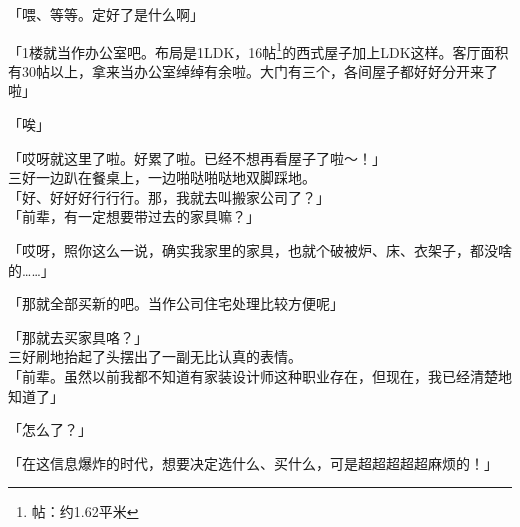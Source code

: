 「喂、等等。定好了是什么啊」

「1楼就当作办公室吧。布局是1LDK，16帖\footnote{帖：约1.62平米}的西式屋子加上LDK这样。客厅面积有30帖以上，拿来当办公室绰绰有余啦。大门有三个，各间屋子都好好分开来了啦」

「唉」

「哎呀就这里了啦。好累了啦。已经不想再看屋子了啦～！」\\

三好一边趴在餐桌上，一边啪哒啪哒地双脚踩地。\\

「好、好好好行行行。那，我就去叫搬家公司了？」\\

「前辈，有一定想要带过去的家具嘛？」

「哎呀，照你这么一说，确实我家里的家具，也就个破被炉、床、衣架子，都没啥的……」

「那就全部买新的吧。当作公司住宅处理比较方便呢」

「那就去买家具咯？」\\

三好刷地抬起了头摆出了一副无比认真的表情。\\

「前辈。虽然以前我都不知道有家装设计师这种职业存在，但现在，我已经清楚地知道了」

「怎么了？」

「在这信息爆炸的时代，想要决定选什么、买什么，可是超超超超超麻烦的！」

